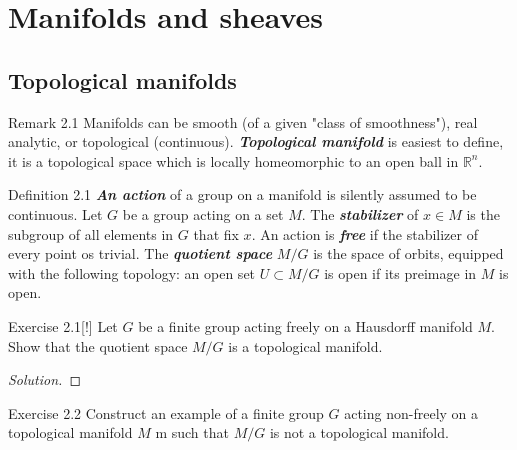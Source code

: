 \section{Manifolds and sheaves}

\subsection{Topological manifolds}

\begin{thing5}{Remark 2.1}\leavevmode
	Manifolds can be smooth (of a given "class of smoothness"), real analytic, or topological (continuous). \textit{\textbf{Topological manifold}} is easiest to define, it is a topological space which is locally homeomorphic to an open ball in $\mathbb{R}^n$.
\end{thing5}

\begin{thing3}{Definition 2.1}\leavevmode
	\textit{\textbf{An action}} of a group on a manifold is silently assumed to be continuous. Let $G$ be a group acting on a set $M$. The \textit{\textbf{stabilizer}} of $x \in M$ is the subgroup of all elements in $G$ that fix $x$. An action is \textit{\textbf{free}} if the stabilizer of every point os trivial. The \textit{\textbf{quotient space}} $M/G$ is the space of orbits, equipped with the following topology: an open set $U \subset M/G $ is open if its preimage in $M$ is open.
\end{thing3}

\begin{thing4}{Exercise 2.1}[!]\label{exer:2.1}\leavevmode
Let $G$ be a finite group acting freely on a Hausdorff manifold $M$. Show that the quotient space $M/G$ is a topological manifold.
\end{thing4}

\begin{proof}[Solution]\leavevmode

\end{proof}

\begin{thing4}{Exercise 2.2}\label{exer:2.2}\leavevmode
Construct an example of a finite group $G$ acting non-freely on a topological manifold $M$ m such that $M/G$ is not a topological manifold.
\end{thing4}

